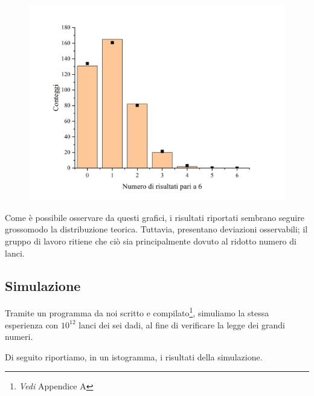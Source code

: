 \documentclass{article}
\begin{document}
\begin{center}
\begin{figure}[H]
        \includegraphics[trim={2cm .5cm 2.4cm 2.1cm},clip,width=.5\textwidth]{img/Dadi6.jpg}
    \end{figure}
\end{center}

Come è possibile osservare da questi grafici, i risultati riportati sembrano seguire
grossomodo la distribuzione teorica. Tuttavia, presentano deviazioni osservabili; il
gruppo di lavoro ritiene che ciò sia principalmente dovuto al ridotto numero di lanci.



\subsection{Simulazione}
Tramite un programma da noi scritto e compilato\footnote{\emph{Vedi} Appendice A},
simuliamo la stessa esperienza con $10^{12}$ lanci dei sei dadi, al fine di
verificare la legge dei grandi numeri.

Di seguito riportiamo, in un istogramma, i risultati della simulazione.
\end{document}
